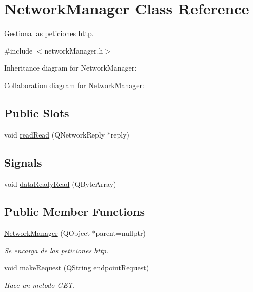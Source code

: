 \hypertarget{classNetworkManager}{}\section{Network\+Manager Class Reference}
\label{classNetworkManager}


Gestiona las peticiones http.  




{\ttfamily \#include $<$network\+Manager.\+h$>$}



Inheritance diagram for Network\+Manager\+:


Collaboration diagram for Network\+Manager\+:
\subsection*{Public Slots}
\begin{DoxyCompactItemize}
\item 
void \hyperlink{classNetworkManager_a88e268513ba60096866887dd19838069}{read\+Read} (Q\+Network\+Reply $\ast$reply)
\end{DoxyCompactItemize}
\subsection*{Signals}
\begin{DoxyCompactItemize}
\item 
void \hyperlink{classNetworkManager_afa06e697f96a990b55cd69e460461fc3}{data\+Ready\+Read} (Q\+Byte\+Array)
\end{DoxyCompactItemize}
\subsection*{Public Member Functions}
\begin{DoxyCompactItemize}
\item 
\hyperlink{classNetworkManager_a25e5a69c0dba31cc028050c2b6eea855}{Network\+Manager} (Q\+Object $\ast$parent=nullptr)
\begin{DoxyCompactList}\small\item\em Se encarga de las peticiones http. \end{DoxyCompactList}\item 
void \hyperlink{classNetworkManager_a4043336eb2e512c9705628fc7b8d0afb}{make\+Request} (Q\+String endpoint\+Request)
\begin{DoxyCompactList}\small\item\em Hace un metodo G\+ET. \end{DoxyCompactList}\end{DoxyCompactItemize}
